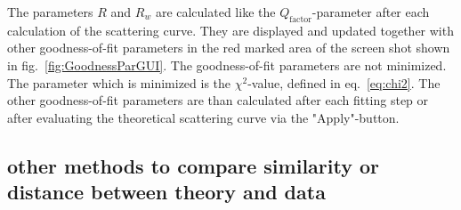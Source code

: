 \vspace{5mm}

The parameters $R$ and $R_w$ are calculated like the $Q_\text{factor}$-parameter after each calculation of the scattering curve. They are displayed and updated together with other goodness-of-fit parameters in the red marked area of the screen shot shown in fig.\ \ref{fig:GoodnessParGUI}. The goodness-of-fit parameters are not minimized. The parameter which is minimized is the $\chi^2$-value, defined in eq.\ \ref{eq:chi2}. The other goodness-of-fit parameters are than calculated after each fitting step or after evaluating the theoretical scattering curve via the "Apply"-button.

\subsection{other methods to compare similarity or distance between theory and data}

